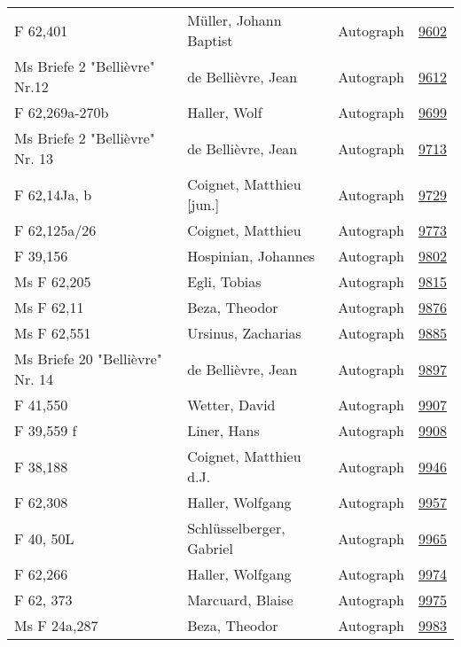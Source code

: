 \documentclass[10pt,a4paper,landscape]{report}
\begin{document}
\begin{longtable}{p{16cm}p{4cm}lr}
F 62,401	&	Müller, Johann Baptist	&	Autograph	&	\href{http://130.60.24.72/assignment/9602}{9602}\\
Ms Briefe 2  "Bellièvre" Nr.12	&	de Bellièvre, Jean	&	Autograph	&	\href{http://130.60.24.72/assignment/9612}{9612}\\
F 62,269a-270b	&	Haller, Wolf	&	Autograph	&	\href{http://130.60.24.72/assignment/9699}{9699}\\
Ms Briefe 2 "Bellièvre" Nr. 13	&	de Bellièvre, Jean	&	Autograph	&	\href{http://130.60.24.72/assignment/9713}{9713}\\
F 62,14Ja, b	&	Coignet, Matthieu [jun.]	&	Autograph	&	\href{http://130.60.24.72/assignment/9729}{9729}\\
F 62,125a/26	&	Coignet, Matthieu	&	Autograph	&	\href{http://130.60.24.72/assignment/9773}{9773}\\
F 39,156	&	Hospinian, Johannes	&	Autograph	&	\href{http://130.60.24.72/assignment/9802}{9802}\\
Ms F 62,205	&	Egli, Tobias	&	Autograph	&	\href{http://130.60.24.72/assignment/9815}{9815}\\
Ms F 62,11	&	Beza, Theodor	&	Autograph	&	\href{http://130.60.24.72/assignment/9876}{9876}\\
Ms F 62,551	&	Ursinus, Zacharias	&	Autograph	&	\href{http://130.60.24.72/assignment/9885}{9885}\\
Ms Briefe 20 "Bellièvre" Nr. 14	&	de Bellièvre, Jean	&	Autograph	&	\href{http://130.60.24.72/assignment/9897}{9897}\\
F 41,550	&	Wetter, David	&	Autograph	&	\href{http://130.60.24.72/assignment/9907}{9907}\\
F 39,559 f	&	Liner, Hans	&	Autograph	&	\href{http://130.60.24.72/assignment/9908}{9908}\\
F 38,188	&	Coignet, Matthieu d.J.	&	Autograph	&	\href{http://130.60.24.72/assignment/9946}{9946}\\
F 62,308	&	Haller, Wolfgang	&	Autograph	&	\href{http://130.60.24.72/assignment/9957}{9957}\\
F 40, 50L	&	Schlüsselberger, Gabriel	&	Autograph	&	\href{http://130.60.24.72/assignment/9965}{9965}\\
F 62,266	&	Haller, Wolfgang	&	Autograph	&	\href{http://130.60.24.72/assignment/9974}{9974}\\
F 62, 373	&	Marcuard, Blaise	&	Autograph	&	\href{http://130.60.24.72/assignment/9975}{9975}\\
Ms F 24a,287	&	Beza, Theodor	&	Autograph	&	\href{http://130.60.24.72/assignment/9983}{9983}\\

\end{longtable}
\end{document}
